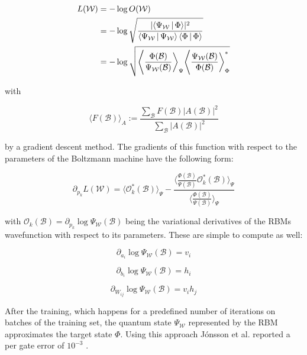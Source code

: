 \begin{align}
    L(\mathcal{W}) &= -\log{O(\mathcal{W})} \\
                   &= -\log{\sqrt{\frac{\lvert \Braket{\Psi_{\mathcal{W}}|\Phi} \rvert^2}{\Braket{\Psi_{\mathcal{W}}|\Psi_{\mathcal{W}}} \Braket{\Phi|\Phi}}}}\\
                   &= -\log{\sqrt{\Bigg\langle \frac{\Phi(\mathcal{B})}{\Psi_{\mathcal{W}}(\mathcal{B})} \bigg \rangle_{\Psi} \Bigg\langle \frac{\Psi_{\mathcal{W}}(\mathcal{B})}{\Phi(\mathcal{B})} \bigg \rangle_{\Phi}^{*}}}
\end{align}

with

\begin{equation}
    \langle F(\mathcal{B})\rangle_A := \frac{\sum_{\mathcal{B}} F(\mathcal{B}) \lvert A(\mathcal{B}) \rvert^2}{\sum_{\mathcal{B}} \lvert A(\mathcal{B})\rvert^2}
\end{equation}

by a gradient descent method. The gradients of this function with respect to 
the parameters of the Boltzmann machine have the following form:

\begin{equation}
   \partial_{p_k}L(\mathcal{W}) = \langle \mathcal{O}_k^*(\mathcal{B}) \rangle_{\Psi} - \frac{\langle \frac{\Phi(\mathcal{B})}{\Psi(\mathcal{B})} \mathcal{O}_k^*(\mathcal{B})\rangle_{\Psi}}{\langle \frac{\Phi(\mathcal{B})}{\Psi(\mathcal{B})} \rangle_{\Psi}}
\end{equation}

with $\mathcal{O}_k(\mathcal{B}) = \partial_{p_k}\log{\Psi_{\mathcal{W}}(\mathcal{B})}$ being the variational derivatives of the RBMs wavefunction with respect to its parameters.
These are simple to compute as well:

\begin{equation}
    \partial_{a_i}\log{\Psi_{\mathcal{W}}(\mathcal{B})} = v_i
\end{equation}

\begin{equation}
    \partial_{b_i}\log{\Psi_{\mathcal{W}}(\mathcal{B})} = h_i
\end{equation}

\begin{equation}
    \partial_{W_{ij}}\log{\Psi_{\mathcal{W}}(\mathcal{B})} = v_ih_j
\end{equation}

After the training, which happens for a predefined number of iterations on batches of the training set,
the quantum state $\Psi_{\mathcal{W}}$ represented by the RBM approximates the target state $\Phi$. Using
this approach J\'{o}nsson et al. reported a per gate error of $10^{-3}$ \cite{jnsson2018neuralnetwork}.
